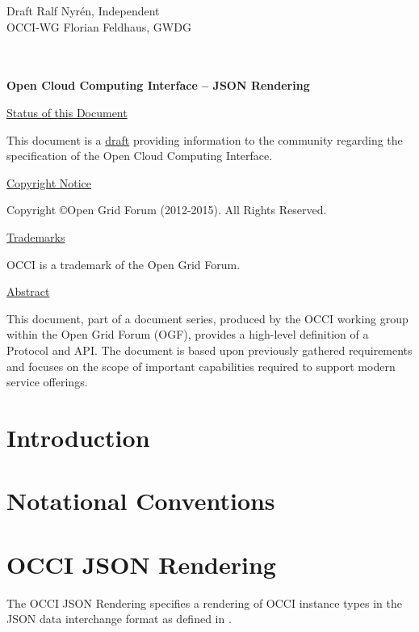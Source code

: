 \documentclass[10pt,a4paper]{article}
\begin{document}
\thispagestyle{empty}

Draft \hfill Ralf Nyrén, Independent \\
OCCI-WG \hfill Florian Feldhaus, GWDG\\
\\
\\

\vspace*{0.5in}

\begin{Large}
\textbf{Open Cloud Computing Interface -- JSON Rendering}
\end{Large}

\vspace*{0.5in}

\underline{Status of this Document}

This document is a \underline{draft} providing information to the community regarding the specification of the Open Cloud Computing Interface.

\underline{Copyright Notice}

Copyright \copyright Open Grid Forum (2012-2015). All Rights Reserved.

\underline{Trademarks}

OCCI is a trademark of the Open Grid Forum.

\underline{Abstract}

This document, part of a document series, produced by the OCCI working
group within the Open Grid Forum (OGF), provides a high-level
definition of a Protocol and API. The document is based upon
previously gathered requirements and focuses on the scope of important
capabilities required to support modern service offerings.

\newpage
\tableofcontents
\newpage

\section{Introduction}


\section{Notational Conventions}


\section{OCCI JSON Rendering}
\label{sec:json_format}
The OCCI JSON Rendering specifies a rendering of OCCI instance types in the JSON
data interchange format as defined in \cite{rfc4627}.
\end{document}

